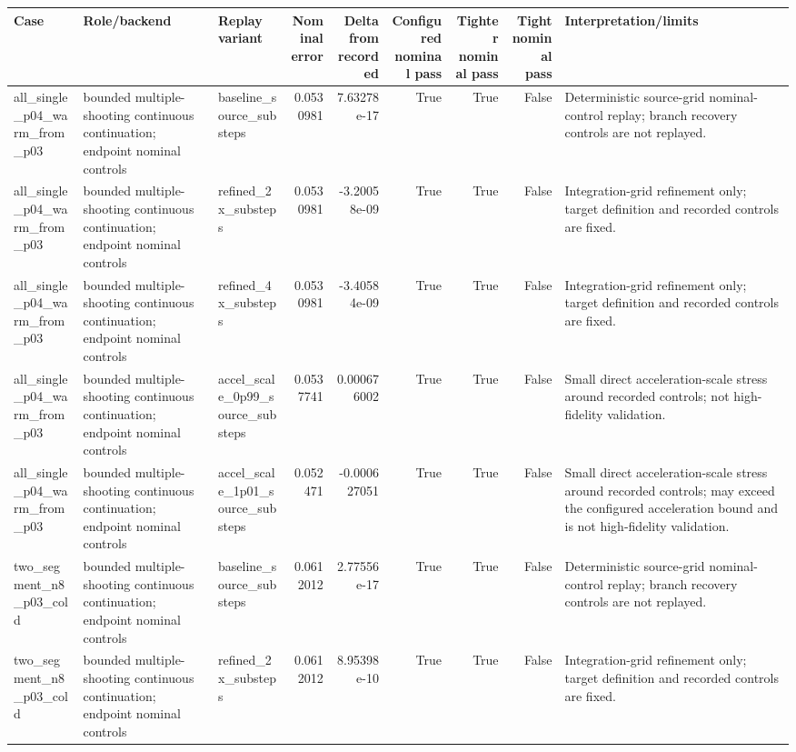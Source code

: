 \begin{tabular}{lllrrrrrl}
\toprule
Case & Role/backend & Replay variant & Nominal error & Delta from recorded & Configured nominal pass & Tighter nominal pass & Tight nominal pass & Interpretation/limits \\
\midrule
all\_single\_p04\_warm\_from\_p03 & bounded multiple-shooting continuous continuation; endpoint nominal controls & baseline\_source\_substeps & 0.0530981 & 7.63278e-17 & True & True & False & Deterministic source-grid nominal-control replay; branch recovery controls are not replayed. \\
all\_single\_p04\_warm\_from\_p03 & bounded multiple-shooting continuous continuation; endpoint nominal controls & refined\_2x\_substeps & 0.0530981 & -3.20058e-09 & True & True & False & Integration-grid refinement only; target definition and recorded controls are fixed. \\
all\_single\_p04\_warm\_from\_p03 & bounded multiple-shooting continuous continuation; endpoint nominal controls & refined\_4x\_substeps & 0.0530981 & -3.40584e-09 & True & True & False & Integration-grid refinement only; target definition and recorded controls are fixed. \\
all\_single\_p04\_warm\_from\_p03 & bounded multiple-shooting continuous continuation; endpoint nominal controls & accel\_scale\_0p99\_source\_substeps & 0.0537741 & 0.000676002 & True & True & False & Small direct acceleration-scale stress around recorded controls; not high-fidelity validation. \\
all\_single\_p04\_warm\_from\_p03 & bounded multiple-shooting continuous continuation; endpoint nominal controls & accel\_scale\_1p01\_source\_substeps & 0.052471 & -0.000627051 & True & True & False & Small direct acceleration-scale stress around recorded controls; may exceed the configured acceleration bound and is not high-fidelity validation. \\
two\_segment\_n8\_p03\_cold & bounded multiple-shooting continuous continuation; endpoint nominal controls & baseline\_source\_substeps & 0.0612012 & 2.77556e-17 & True & True & False & Deterministic source-grid nominal-control replay; branch recovery controls are not replayed. \\
two\_segment\_n8\_p03\_cold & bounded multiple-shooting continuous continuation; endpoint nominal controls & refined\_2x\_substeps & 0.0612012 & 8.95398e-10 & True & True & False & Integration-grid refinement only; target definition and recorded controls are fixed. \\

\end{tabular}
